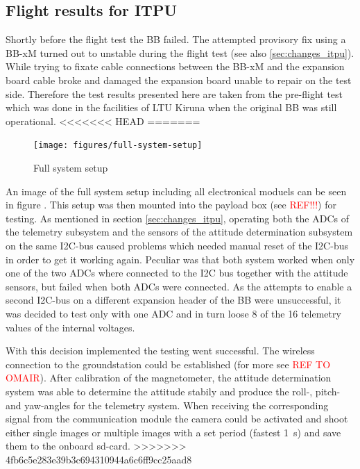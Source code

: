 \subsection{Flight results for ITPU}

Shortly before the flight test the BB failed. The attempted provisory fix using a BB-xM turned out to unstable during the flight test (see also \ref{sec:changes_itpu}). While trying to fixate cable connections between the BB-xM and the expansion board cable broke and damaged the expansion board unable to repair on the test side. Therefore the test results presented here are taken from the pre-flight test which was done in the facilities of LTU Kiruna when the original BB was still operational.
<<<<<<< HEAD
=======

\begin{figure}
\centering
\texttt{[image: figures/full-system-setup]}
\caption{Full system setup}
\label{fig:FlightTest1_1}
\end{figure}

An image of the full system setup including all electronical moduels can be seen in figure . This setup was then mounted into the payload box (see \textcolor{red}{REF!!!}) for testing. As mentioned in section \ref{sec:changes_itpu}, operating both the ADCs of the telemetry subsystem and the sensors of the attitude determination subsystem on the same I2C-bus caused problems which needed manual reset of the I2C-bus in order to get it working again. Peculiar was that both system worked when only one of the two ADCs where connected to the I2C bus together with the attitude sensors, but failed when both ADCs were connected. As the attempts to enable a second I2C-bus on a different expansion header of the BB were unsuccessful, it was decided to test only with one ADC and in turn loose 8 of the 16 telemetry values of the internal voltages. 

With this decision implemented the testing went successful. The wireless connection to the groundstation could be established (for more see \textcolor{red}{REF TO OMAIR}). After calibration of the magnetometer, the attitude determination system was able to determine the attitude stabily and produce the roll-, pitch- and yaw-angles for the telemetry system. When receiving the corresponding signal from the communication module the camera could be activated and shoot either single images or multiple images with a set period (fastest 1~s) and save them to the onboard sd-card.  
>>>>>>> 4fb6c5e283e39b3c694310944a6c6ff9cc25aad8

